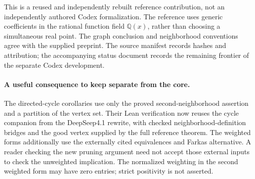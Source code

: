 This is a reused and independently rebuilt reference contribution, not an
independently authored Codex formalization. The reference uses generic
coefficients in the rational function field $\mathbb Q(x)$, rather than
choosing a simultaneous real point. The graph conclusion and neighborhood
conventions agree with the supplied preprint. The source manifest records
hashes and attribution; the accompanying status document records the
remaining frontier of the separate Codex development.

\paragraph{A useful consequence to keep separate from the core.}
The directed-cycle corollaries use only the proved second-neighborhood
assertion and a partition of the vertex set. Their Lean verification now
reuses the cycle companion from the DeepSeep4.1 rewrite, with checked
neighborhood-definition bridges and the good vertex supplied by the full
reference theorem. The weighted forms additionally
use the externally cited equivalences and Farkas alternative. A reader
checking the new pruning argument need not accept those external inputs to
check the unweighted implication. The normalized weighting in the second
weighted form may have zero entries; strict positivity is not asserted.
